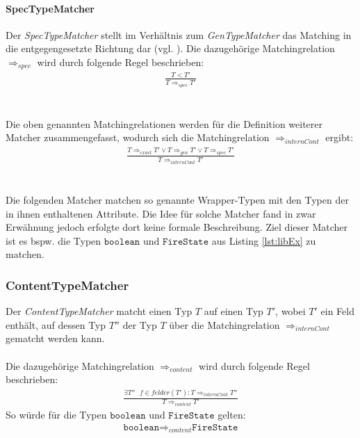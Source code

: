 \paragraph{SpecTypeMatcher}
Der \emph{SpecTypeMatcher} stellt im Verhältnis zum \emph{GenTypeMatcher} das Matching in die entgegengesetzte Richtung dar (vgl. \cite{moormann}). Die dazugehörige Matchingrelation $\Rightarrow_{spec}$ wird durch folgende Regel beschrieben: 
\begin{gather*}
\frac{T < T'}{T \Rightarrow_{spec} T'}
\end{gather*}
\\\\
Die oben genannten Matchingrelationen werden für die Definition weiterer Matcher zusammengefasst, wodurch sich die Matchingrelation $\Rightarrow_{internCont}$ ergibt:
\begin{gather*}
\frac{T \Rightarrow_{exact} T' \vee T \Rightarrow_{gen} T' \vee
T \Rightarrow_{spec} T'  }{T \Rightarrow_{internCont} T'}
\end{gather*}
\noindent
\\\\
Die folgenden Matcher matchen so genannte Wrapper-Typen mit den Typen der in ihnen enthaltenen Attribute. Die Idee für solche Matcher fand in \cite{hummel08} zwar Erwähnung jedoch erfolgte dort keine formale Beschreibung. Ziel dieser Matcher ist es bspw. die Typen $\texttt{boolean}$ und $\texttt{FireState}$ aus Listing \ref{lst:libEx} zu matchen.
\subsubsection{ContentTypeMatcher}
Der \emph{ContentTypeMatcher} matcht einen Typ $T$ auf einen Typ $T'$, wobei $T'$ ein Feld enthält, auf dessen Typ $T''$ der Typ $T$ über die Matchingrelation $\Rightarrow_{internCont}$ gematcht werden kann.
\\\\
Die dazugehörige Matchingrelation $\Rightarrow_{content}$ wird durch folgende Regel beschrieben:
\begin{gather*}
\frac{\exists \mathit{T''\text{ }f}\in felder(T'): T \Rightarrow_{internCont} T''}{T \Rightarrow_{content} T'}
\end{gather*}
\noindent
So würde für die Typen $\texttt{boolean}$ und $\texttt{FireState}$ gelten: 
\begin{gather*}
\texttt{boolean} \Rightarrow_{content} \texttt{FireState}
\end{gather*}
